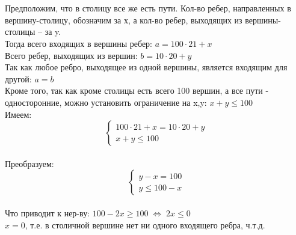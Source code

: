 \documentclass[a4paper,12pt]{article}
\begin{document}
\\
\\
Предположим, что в столицу все же есть пути. Кол-во ребер, направленных в вершину-столицу, обозначим за х, а кол-во ребер, выходящих из вершины-столицы -- за y.
\\
Тогда всего входящих в вершины ребер: $ a = 100 \cdot 21 + x $
\\
Всего ребер, выходящих из вершин: $ b = 10 \cdot 20 + y $
\\
Так как любое ребро, выходящее из одной вершины, является входящим для другой: $ a = b $
\\
Кроме того, так как кроме столицы есть всего 100 вершин, а все пути - односторонние, можно установить ограничение на x,y: $ x + y \leq 100 $
\\
Имеем: 
\begin{equation*}
 \begin{cases}
100 \cdot 21 + x = 10 \cdot 20 + y 
\\
 x + y \leq 100 
 \end{cases}
\end{equation*}
\\
Преобразуем:
\\
\begin{equation*}
 \begin{cases}
y - x = 100
\\
y \leq 100 - x
 \end{cases}
\end{equation*}
\\
Что приводит к нер-ву: $ 100 - 2x \geq 100 \; \Leftrightarrow \; 2x \leq 0 $\\
$ x = 0 $, т.е. в столичной вершине нет ни одного входящего ребра, ч.т.д.
\end{document}

